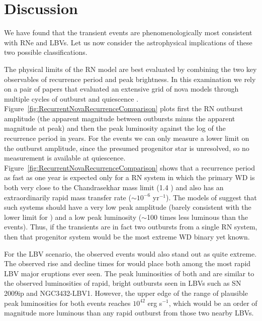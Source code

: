 \section{Discussion}
\label{sec:Discussion}

We have found that the \spock transient events are phenomenologically
most consistent with RNe and LBVs.  Let us now consider
the astrophysical implications of these two possible classifications.

The physical limits of the RN model are best evaluated by combining
the two key observables of recurrence period and peak brightness. In
this examination we rely on a pair of papers that evaluated an
extensive grid of nova models through multiple cycles of outburst and
quiescence \citep{Prialnik:1995,Yaron:2005}.
Figure~\ref{fig:RecurrentNovaRecurrenceComparison} plots first the RN
outburst amplitude (the apparent magnitude between outbursts minus the
apparent magnitude at peak) and then the peak luminosity against the
log of the recurrence period in years.
For the \spock events we can only measure a lower limit on the
outburst amplitude, since the presumed progenitor star is unresolved,
so no measurement is available at
quiescence. Figure~\ref{fig:RecurrentNovaRecurrenceComparison} shows
that a recurrence period as fast as one year is expected only for a RN
system in which the primary WD is both very close to the Chandrasekhar
mass limit (1.4 \Msun) and also has an extraordinarily rapid mass
transfer rate ($\sim10^{-6}$ \Msun yr$^{-1}$).  The models of
\citet{Yaron:2005} suggest that such systems should have a very low
peak amplitude (barely consistent with the lower limit for \spock) and
a low peak luminosity ($\sim$100 times less luminous than the \spock
events).  Thus, if the \spock transients are in fact two outbursts
from a single RN system, then that progenitor system would be the most
extreme WD binary yet known.

For the LBV scenario, the observed \spock events would also stand out
as quite extreme.  The observed rise and decline times for \spock
would place both among the most rapid LBV major eruptions ever seen.
The peak luminosities of both \spockone and \spocktwo are similar to
the observed luminosities of rapid, bright outbursts seen in LBVs such
as SN 2009ip and NGC3432-LBV1. However, the upper edge of the range of
plausible peak luminosities for both \spock events reaches $10^{42}$
erg s$^{-1}$, which would be an order of magnitude more luminous than
any rapid outburst from those two nearby LBVs.


